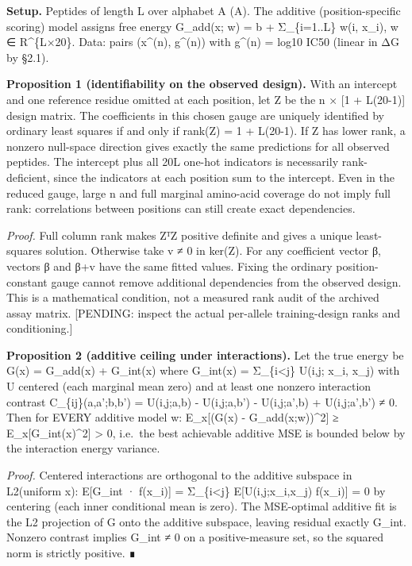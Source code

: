 \textbf{Setup.} Peptides of length L over alphabet A (\textbar A). The additive (position-specific scoring) model assigns free energy G\_add(x; w) = b + Σ\_\{i=1..L\} w(i, x\_i), w ∈ R\^{}\{L×20\}. Data: pairs (x\^{}(n), g\^{}(n)) with g\^{}(n) = log10 IC50 (linear in ΔG by §2.1).

\textbf{Proposition 1 (identifiability on the observed design).} With an intercept and one reference residue omitted at each position, let Z be the n × {[}1 + L(20-1){]} design matrix. The coefficients in this chosen gauge are uniquely identified by ordinary least squares if and only if rank(Z) = 1 + L(20-1). If Z has lower rank, a nonzero null-space direction gives exactly the same predictions for all observed peptides. The intercept plus all 20L one-hot indicators is necessarily rank-deficient, since the indicators at each position sum to the intercept. Even in the reduced gauge, large n and full marginal amino-acid coverage do not imply full rank: correlations between positions can still create exact dependencies.

\emph{Proof.} Full column rank makes ZᵀZ positive definite and gives a unique least-squares solution. Otherwise take v ≠ 0 in ker(Z). For any coefficient vector β, vectors β and β+v have the same fitted values. Fixing the ordinary position-constant gauge cannot remove additional dependencies from the observed design. This is a mathematical condition, not a measured rank audit of the archived assay matrix. {[}PENDING: inspect the actual per-allele training-design ranks and conditioning.{]}

\textbf{Proposition 2 (additive ceiling under interactions).} Let the true energy be G(x) = G\_add(x) + G\_int(x) where G\_int(x) = Σ\_\{i\textless j\} U(i,j; x\_i, x\_j) with U centered (each marginal mean zero) and at least one nonzero interaction contrast C\_\{ij\}(a,a';b,b') = U(i,j;a,b) - U(i,j;a,b') - U(i,j;a',b) + U(i,j;a',b') ≠ 0. Then for EVERY additive model w: E\_x{[}(G(x) - G\_add(x;w))\^{}2{]} ≥ E\_x{[}G\_int(x)\^{}2{]} \textgreater{} 0, i.e.~the best achievable additive MSE is bounded below by the interaction energy variance.

\emph{Proof.} Centered interactions are orthogonal to the additive subspace in L2(uniform x): E{[}G\_int · f(x\_i){]} = Σ\_\{i\textless j\} E{[}U(i,j;x\_i,x\_j) f(x\_i){]} = 0 by centering (each inner conditional mean is zero). The MSE-optimal additive fit is the L2 projection of G onto the additive subspace, leaving residual exactly G\_int. Nonzero contrast implies G\_int ≠ 0 on a positive-measure set, so the squared norm is strictly positive. ∎

